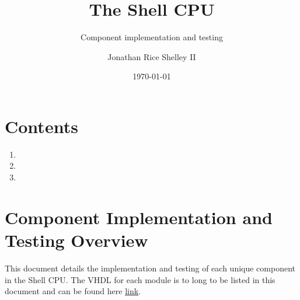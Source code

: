 \documentclass{article}
\subtitle{Component implementation and testing}
\title{The Shell CPU}
\author{Jonathan Rice Shelley II}
\date{\today}
\begin{document}
\maketitle

\section{Contents}
\begin{par}
	\begin{enumerate}
	\item {}
	\item {}
	\item {}
	\end{enumerate}
\end{par}

\section{Component Implementation and Testing Overview }
\label{overview}
\begin{par}
	This document details the implementation and testing of each unique component in the Shell CPU. The VHDL for each module is to long to be listed in this document and can be found here \href{http:\\google.com}{link}. 
\end{par}

\newpage
\end{document}
